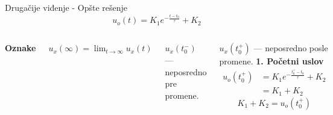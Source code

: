 \begin{frame}[label=08-s051]{Drugačije viđenje - Opšte rešenje}
\setlength{\parskip}{2pt}
\setlength{\abovedisplayskip}{4pt}\setlength{\belowdisplayskip}{4pt}
\[u_o(t)=K_1e^{-\frac{t-t_0}{\tau}}+K_2\]
\begin{columns}[T,onlytextwidth]
\textbf{Oznake}\par\medskip
$u_x(\infty)=\displaystyle\lim_{t\to\infty}u_x(t)$\par\medskip
$u_x(t_0^-)$ — neposredno pre promene.\par\medskip
$u_x(t_0^+)$ — neposredno posle promene.
\textbf{1. Početni uslov}
\begin{align*}
u_o(t_0^+)&=K_1e^{-\frac{t_0^+-t_0}{\tau}}+K_2\\
&=K_1+K_2
\end{align*}
\[K_1+K_2=u_o(t_0^+)\]
\end{columns}
\end{frame}
